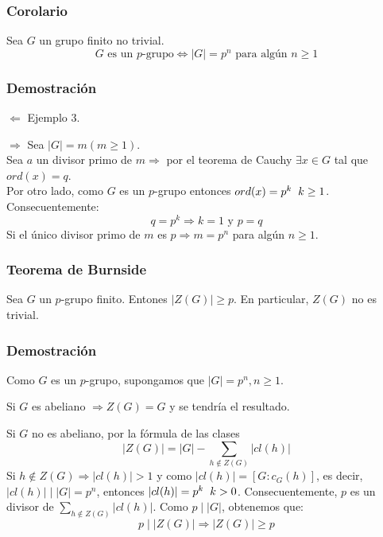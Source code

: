 \documentclass[11pt,a4paper]{article}
\begin{document}
\subsubsection*{Corolario}

Sea $G$ un grupo finito no trivial.
$$G \text{ es un } p \text{-grupo} \iff |G| = p^{n} \text{ para algún } n \geq 1$$

\subsubsection*{Demostración}

\begin{enumerate*}
\item[$\Leftarrow$] Ejemplo 3.
\item[$\Rightarrow$] Sea $|G| = m (m \geq 1)$. \\
Sea $a$ un divisor primo de $m \Rightarrow$ por el teorema de Cauchy $\exists x \in G$ tal que $ord(x) = q$. \\
Por otro lado, como $G$ es un $p$-grupo entonces $ord(x) = p^{k} \hspace{0.2cm} k \geq 1$. \\
Consecuentemente:
$$q = p^{k} \Rightarrow k = 1 \text{ y } p = q$$
Si el único divisor primo de $m$ es $p \Rightarrow m = p^{n}$ para algún $n \geq 1$.
\end{enumerate*}


\subsubsection*{Teorema de Burnside}

Sea $G$ un $p$-grupo finito. Entones $|Z(G)| \geq p$. En particular, $Z(G)$ no es trivial.

\subsubsection*{Demostración}

Como $G$ es un $p$-grupo, supongamos que $|G| = p^{n}, n \geq 1$.

Si $G$ es abeliano $\Rightarrow Z(G) = G$ y se tendría el resultado.

Si $G$ no es abeliano, por la fórmula de las clases
$$|Z(G)| = |G| - \sum_{h \notin Z(G)} |cl(h)|$$
Si $h \notin Z(G) \Rightarrow |cl(h)| > 1$ y como $|cl(h)| = [G:c_{G}(h)]$, es decir, $|cl(h)| \mid |G| = p^{n}$, entonces $|cl(h)| = p^{k} \hspace{0.2cm} k > 0$. Consecuentemente, $p$ es un divisor de $\sum_{h \notin Z(G)} |cl(h)|$. Como $p \mid |G|$, obtenemos que:
$$p \mid |Z(G)| \Rightarrow |Z(G)| \geq p$$
\end{document}
